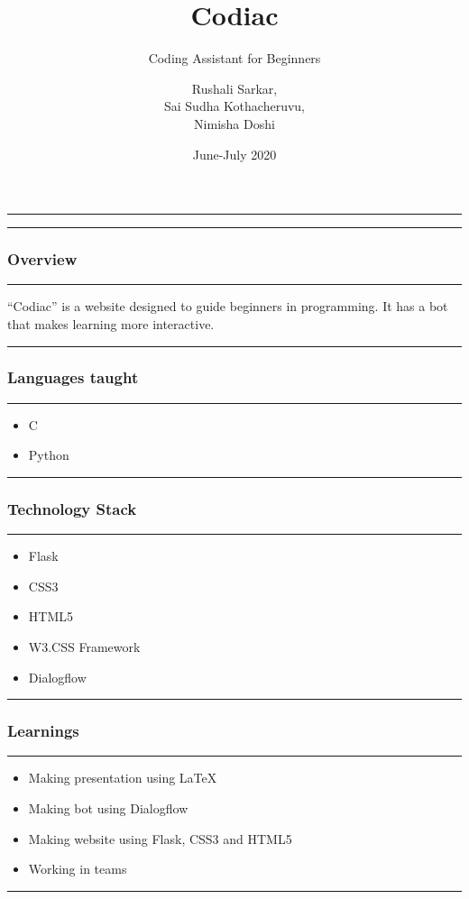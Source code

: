 \documentclass[14pt]{beamer}
\title[Codiac]{Codiac}
\subtitle[Coding Assitant]{Coding Assistant for Beginners}
\author[Team 2]{Rushali Sarkar, \\ Sai Sudha Kothacheruvu, \\ Nimisha Doshi}
\date[June 2020]{June-July 2020}
\begin{document}
\begin{frame}
    \noindent
    {\color{blue} \rule{\linewidth}{0.7mm} }
    \titlepage
    \noindent
    {\color{blue} \rule{\linewidth}{0.7mm} }
\end{frame}

\begin{frame}
    \frametitle{Overview}
    \noindent
    {\color{blue} \rule{\linewidth}{0.7mm} }
    ``Codiac'' is a website designed to guide beginners in programming. It has a bot that makes learning more interactive.
    \noindent
    {\color{blue} \rule{\linewidth}{0.7mm} }
\end{frame}

\begin{frame}
    \frametitle{Languages taught}
    \noindent
    {\color{blue} \rule{\linewidth}{0.7mm} }
    \begin{itemize}
    \item C
    \item Python
\end{itemize}   
\noindent
    {\color{blue} \rule{\linewidth}{0.7mm} }
\end{frame}


\begin{frame}
    \frametitle{Technology Stack}
    \noindent
    {\color{blue} \rule{\linewidth}{0.7mm} }
    \begin{itemize}
        \pause
    \item Flask \\
        \pause
    \item CSS3 \\
        \pause
    \item HTML5 \\
        \pause
    \item W3.CSS Framework \\
        \pause
    \item Dialogflow \\
\end{itemize}
\noindent
    {\color{blue} \rule{\linewidth}{0.7mm} }
\end{frame}

\begin{frame}
    \frametitle{Learnings}
    \noindent
    {\color{blue} \rule{\linewidth}{0.7mm} }
    \begin{itemize}
        \pause
    \item Making presentation using LaTeX \\
        \pause
    \item Making bot using Dialogflow \\
        \pause
    \item Making website using Flask, CSS3 and HTML5 \\
        \pause
    \item Working in teams\\
\end{itemize}
\noindent
    {\color{blue} \rule{\linewidth}{0.7mm} }
\end{frame}
\end{document}

